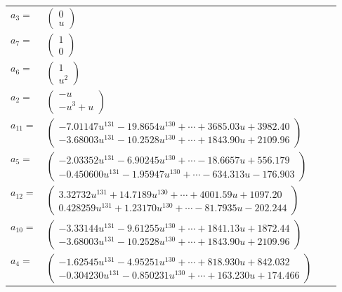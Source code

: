 \documentclass[1p]{elsarticle_modified}
\theoremstyle{definition}
\begin{document}
\begin{tabular}{m{7pt} m{180pt} m{7pt} m{180pt} }
\flushright $a_{3}=$&$\begin{pmatrix}0\\u\end{pmatrix}$ \\
\flushright $a_{7}=$&$\begin{pmatrix}1\\0\end{pmatrix}$ \\
\flushright $a_{6}=$&$\begin{pmatrix}1\\u^2\end{pmatrix}$ \\
\flushright $a_{2}=$&$\begin{pmatrix}- u\\- u^3+u\end{pmatrix}$ \\
\flushright $a_{11}=$&$\begin{pmatrix}-7.01147 u^{131}-19.8654 u^{130}+\cdots+3685.03 u+3982.40\\-3.68003 u^{131}-10.2528 u^{130}+\cdots+1843.90 u+2109.96\end{pmatrix}$ \\
\flushright $a_{5}=$&$\begin{pmatrix}-2.03352 u^{131}-6.90245 u^{130}+\cdots-18.6657 u+556.179\\-0.450600 u^{131}-1.95947 u^{130}+\cdots-634.313 u-176.903\end{pmatrix}$ \\
\flushright $a_{12}=$&$\begin{pmatrix}3.32732 u^{131}+14.7189 u^{130}+\cdots+4001.59 u+1097.20\\0.428259 u^{131}+1.23170 u^{130}+\cdots-81.7935 u-202.244\end{pmatrix}$ \\
\flushright $a_{10}=$&$\begin{pmatrix}-3.33144 u^{131}-9.61255 u^{130}+\cdots+1841.13 u+1872.44\\-3.68003 u^{131}-10.2528 u^{130}+\cdots+1843.90 u+2109.96\end{pmatrix}$ \\
\flushright $a_{4}=$&$\begin{pmatrix}-1.62545 u^{131}-4.95251 u^{130}+\cdots+818.930 u+842.032\\-0.304230 u^{131}-0.850231 u^{130}+\cdots+163.230 u+174.466\end{pmatrix}$ \\

\end{tabular}
\end{document}

